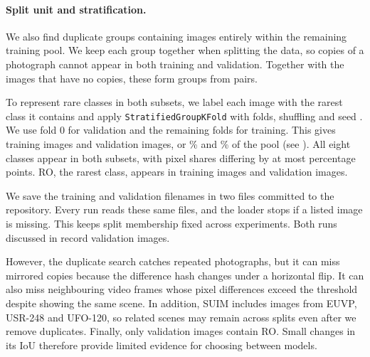 
\paragraph{Split unit and stratification.}
We also find \suimWithinGroups{} duplicate groups containing
\suimWithinGroupImages{} images entirely within the remaining training pool.
We keep each group together when splitting the data, so copies of a photograph
cannot appear in both training and validation. Together with the images that
have no copies, these form \suimSplitGroups{} groups from
\suimTrainValUsable{} pairs.

To represent rare classes in both subsets, we label each image with the rarest
class it contains and apply \texttt{StratifiedGroupKFold} with
\suimValFolds{} folds, shuffling and seed \suimSplitSeed{}. We use fold 0 for
validation and the remaining folds for training. This gives
\suimTrainImages{} training images and \suimValImages{} validation images,
or \suimTrainPercent\% and \suimValPercent\% of the pool
(see ). All eight classes appear in both subsets,
with pixel shares differing by at most \suimMaxShareGap{} percentage points.
RO, the rarest class, appears in \suimImagesTrainRO{} training images and
\suimImagesValRO{} validation images.



We save the training and validation filenames in two files committed to the
repository. Every run reads these same files, and the loader stops if a listed
image is missing. This keeps split membership fixed across experiments. Both
runs discussed in  record
\suimValImages{} validation images.

However, the duplicate search catches repeated photographs, but it can miss mirrored
copies because the difference hash changes under a horizontal flip. It can
also miss neighbouring video frames whose pixel differences exceed the
threshold despite showing the same scene. In addition, SUIM includes images
from EUVP, USR-248 and UFO-120, so related scenes may remain across splits even
after we remove duplicates. Finally, only \suimImagesValRO{} validation images
contain RO. Small changes in its IoU therefore provide limited evidence for
choosing between models.


